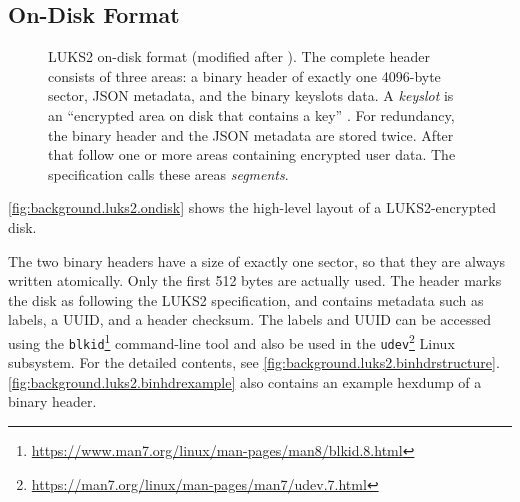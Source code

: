 \subsection{On-Disk Format}
\label{chap:background.luks2.ondisk}
\begin{figure}[htb!]
	\caption[
		LUKS2 on-disk format
	]{
		LUKS2 on-disk format (modified after \cite{Broz2018}). The complete header consists of three areas: a binary header of exactly one 4096-byte sector, JSON metadata, and the binary keyslots data. A \emph{keyslot} is an ``encrypted area on disk that contains a key'' \cite{Broz2018}. For redundancy, the binary header and the JSON metadata are stored twice. After that follow one or more areas containing encrypted user data. The specification calls these areas \emph{segments}.
	}
	\label{fig:background.luks2.ondisk}
\end{figure}

\autoref{fig:background.luks2.ondisk} shows the high-level layout of a LUKS2-encrypted disk.

The two binary headers have a size of exactly one sector, so that they are always written atomically. Only the first 512 bytes are actually used. The header marks the disk as following the LUKS2 specification, and contains metadata such as labels, a UUID, and a header checksum. The labels and UUID can be accessed using the \texttt{blkid}\footnote{\label{fn:background.luks2.blkid} \url{https://www.man7.org/linux/man-pages/man8/blkid.8.html}} command-line tool and also be used in the \texttt{udev}\footnote{\label{fn:background.luks2.udev} \url{https://man7.org/linux/man-pages/man7/udev.7.html}} Linux subsystem. For the detailed contents, see \autoref{fig:background.luks2.binhdrstructure}. \autoref{fig:background.luks2.binhdrexample} also contains an example hexdump of a binary header.

